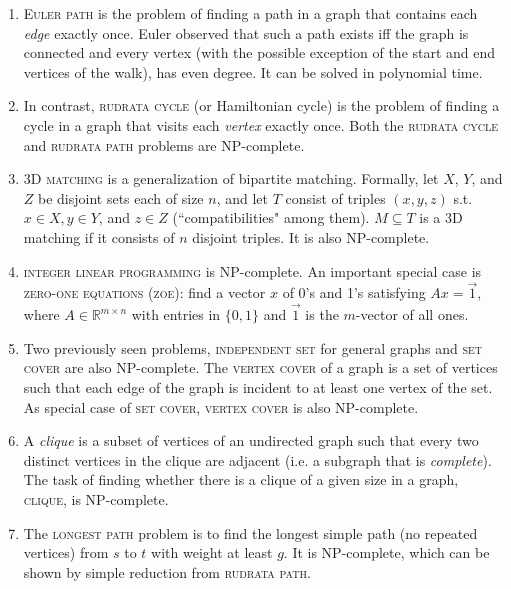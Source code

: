 \documentclass[10pt]{article}
\begin{document}
\begin{multicols}{2}
\begin{addmargin}[0.8em]{0.5em}
\begin{enumerate}[label=(\alph*)]
        \item \textsc{Euler path} is the problem of finding a path in a graph that contains each \textit{edge} exactly once. Euler observed that such a path exists iff the graph is connected and every vertex (with the possible exception of the start and end vertices of the walk), has even degree. It can be solved in polynomial time.
        
        \item In contrast, \textsc{rudrata cycle} (or Hamiltonian cycle) is the problem of finding a cycle in a graph that visits each \textit{vertex} exactly once. Both the \textsc{rudrata cycle} and \textsc{rudrata path} problems are NP-complete.
        
        \item \textsc{3D matching} is a generalization of bipartite matching. Formally, let $X$, $Y$, and $Z$ be disjoint sets each of size $n$, and let $T$ consist of triples $(x, y, z)$ s.t. $x \in X, y \in Y$, and $z \in Z$  (``compatibilities" among them). $M \subseteq T$ is a 3D matching if it consists of $n$ disjoint triples. It is also NP-complete.
        
        \item \textsc{integer linear programming} is NP-complete. An important special case is \textsc{zero-one equations (zoe)}: find a vector $x$ of 0's and 1's satisfying $Ax=\vec{1}$, where $A \in \mathbb{R}^{m \times n}$ with entries in $\{0,1\}$ and $\vec{1}$ is the $m$-vector of all ones.
        
        \item Two previously seen problems, \textsc{independent set} for general graphs and \textsc{set cover} are also NP-complete. The \textsc{vertex cover} of a graph is a set of vertices such that each edge of the graph is incident to at least one vertex of the set. As special case of \textsc{set cover}, \textsc{vertex cover} is also NP-complete.
        
        \item A \textit{clique} is a subset of vertices of an undirected graph such that every two distinct vertices in the clique are adjacent (i.e. a subgraph that is \textit{complete}). The task of finding whether there is a clique of a given size in a graph, \textsc{clique}, is NP-complete.
        
        \item The \textsc{longest path} problem is to find the longest simple path (no repeated vertices) from $s$ to $t$ with weight at least $g$. It is NP-complete, which can be shown by simple reduction from \textsc{rudrata path}. 
        

\end{enumerate}
\end{addmargin}
\end{multicols}
\end{document}
